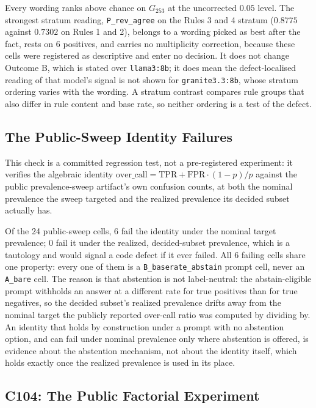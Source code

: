 Every wording ranks above chance on $G_{253}$ at the uncorrected $0.05$ level. The strongest
stratum reading, \texttt{P\_rev\_agree} on the Rules 3 and 4 stratum ($0.8775$ against
$0.7302$ on Rules 1 and 2), belongs to a wording picked as best after the fact, rests on $6$
positives, and carries no multiplicity correction, because these cells were registered as
descriptive and enter no decision. It does not change Outcome B, which is stated over
\texttt{llama3:8b}; it does mean the defect-localised reading of that model's signal is not
shown for \texttt{granite3.3:8b}, whose stratum ordering varies with the wording. A stratum contrast
compares rule groups that also differ in rule content and base rate, so neither ordering is a test of
the defect.

\subsection{The Public-Sweep Identity Failures}
\label{sup:sec:s5-identity}

This check is a committed regression test, not a pre-registered experiment:
it verifies the algebraic identity
$\mathrm{over\_call} = \mathrm{TPR} + \mathrm{FPR}\cdot(1-p)/p$ against the
public prevalence-sweep artifact's own confusion counts, at both the nominal
prevalence the sweep targeted and the realized prevalence its decided subset
actually has.

Of the 24 public-sweep cells, 6 fail the identity under the nominal target
prevalence; 0 fail it under the realized, decided-subset prevalence, which is
a tautology and would signal a code defect if it ever failed. All 6 failing
cells share one property: every one of them is a \texttt{B\_baserate\_abstain}
prompt cell, never an \texttt{A\_bare} cell. The reason is that abstention is
not label-neutral: the abstain-eligible prompt withholds an answer at a
different rate for true positives than for true negatives, so the decided
subset's realized prevalence drifts away from the nominal target the
publicly reported over-call ratio was computed by dividing by. An identity
that holds by construction under a prompt with no abstention option, and can
fail under nominal prevalence only where abstention is offered, is evidence
about the abstention mechanism, not about the identity itself, which holds
exactly once the realized prevalence is used in its place.

\subsection{C104: The Public Factorial Experiment}
\label{sup:sec:s5-c104}


